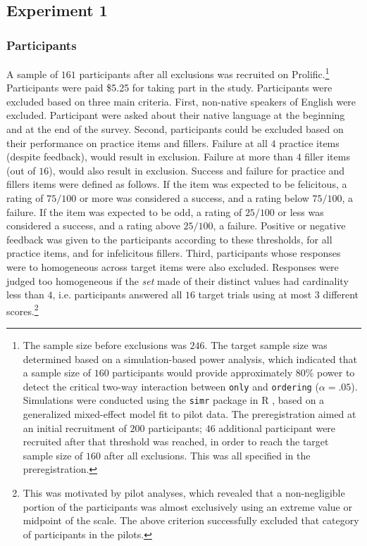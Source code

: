 \subsection{Experiment 1} 
\subsubsection{Participants}
A sample of $161$ participants after all exclusions was recruited on Prolific.\footnote{The sample size before exclusions was $246$. The target sample size was determined based on a simulation-based power analysis, which indicated that a sample size of $160$ participants would provide approximately $80\%$ power to detect the critical two-way interaction between \texttt{only} and \texttt{ordering} ($\alpha=.05$). Simulations were conducted using the \texttt{simr} package in R \parencite{Green2016}, based on a generalized mixed-effect model fit to pilot data. The preregistration aimed at an initial recruitment of $200$ participants; $46$ additional participant were recruited after that threshold was reached, in order to reach the target sample size of $160$ after all exclusions. This was all specified in the preregistration.} Participants were paid \$5.25 for taking part in the study. Participants were excluded based on three main criteria. First, non-native speakers of English were excluded. Participant were asked about their native language at the beginning and at the end of the survey. Second, participants could be excluded based on their performance on practice items and fillers. Failure at all $4$ practice items (despite feedback), would result in exclusion. Failure at more than $4$ filler items (out of $16$), would also result in exclusion. Success and failure for practice and fillers items were defined as follows. If the item was expected to be felicitous, a rating of $75/100$ or more was considered a success, and a rating below $75/100$, a failure. If the item was expected to be odd, a rating of $25/100$ or less was considered a success, and a rating above $25/100$, a failure. Positive or negative feedback was given to the participants according to these thresholds, for all practice items, and for infelicitous fillers. Third, participants whose responses were to homogeneous across target items were also excluded. Responses were judged too homogeneous if the \textit{set} made of their distinct values had cardinality less than $4$, i.e. participants answered all $16$ target trials using at most $3$ different scores.\footnote{This was motivated by pilot analyses, which revealed that a non-negligible portion of the participants was almost exclusively using an extreme value or midpoint of the scale. The above criterion successfully excluded that category of participants in the pilots.}  %


